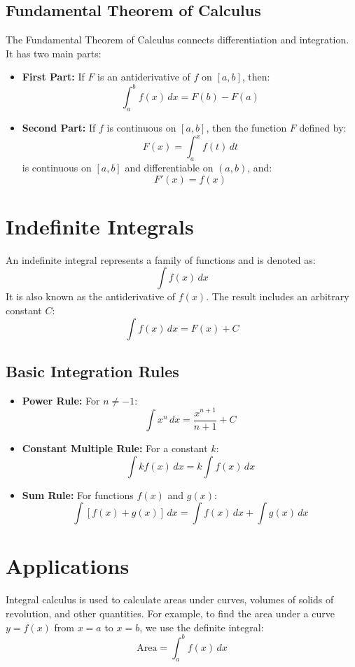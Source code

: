 \documentclass{article}
\begin{document}
\subsection{Fundamental Theorem of Calculus}

The Fundamental Theorem of Calculus connects differentiation and integration. It has two main parts:
\begin{itemize}
    \item \textbf{First Part:} If \(F\) is an antiderivative of \(f\) on \([a, b]\), then:
    \[
    \int_{a}^{b} f(x) \, dx = F(b) - F(a)
    \]
    \item \textbf{Second Part:} If \(f\) is continuous on \([a, b]\), then the function \(F\) defined by:
    \[
    F(x) = \int_{a}^{x} f(t) \, dt
    \]
    is continuous on \([a, b]\) and differentiable on \((a, b)\), and:
    \[
    F'(x) = f(x)
    \]
\end{itemize}

\section{Indefinite Integrals}

An indefinite integral represents a family of functions and is denoted as:
\[
\int f(x) \, dx
\]
It is also known as the antiderivative of \(f(x)\). The result includes an arbitrary constant \(C\):
\[
\int f(x) \, dx = F(x) + C
\]

\subsection{Basic Integration Rules}

\begin{itemize}
    \item \textbf{Power Rule:} For \(n \neq -1\):
    \[
    \int x^n \, dx = \frac{x^{n+1}}{n+1} + C
    \]
    \item \textbf{Constant Multiple Rule:} For a constant \(k\):
    \[
    \int k f(x) \, dx = k \int f(x) \, dx
    \]
    \item \textbf{Sum Rule:} For functions \(f(x)\) and \(g(x)\):
    \[
    \int [f(x) + g(x)] \, dx = \int f(x) \, dx + \int g(x) \, dx
    \]
\end{itemize}

\section{Applications}

Integral calculus is used to calculate areas under curves, volumes of solids of revolution, and other quantities. For example, to find the area under a curve \(y = f(x)\) from \(x = a\) to \(x = b\), we use the definite integral:
\[
\text{Area} = \int_{a}^{b} f(x) \, dx
\]
\end{document}
